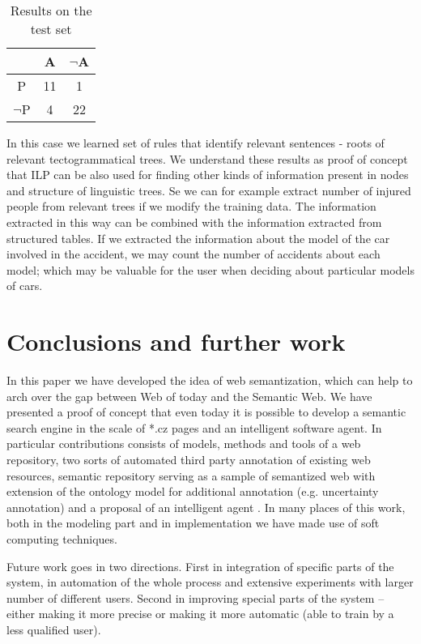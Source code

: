 \documentclass{sig-alternate}
\begin{document}
\begin{table}
\label{tab:results}
\centering
\caption{Results on the test set}
\begin{tabular}{|c|c|c|} \hline
 		&A	&$\neg$A	\\ \hline
P		& 11&1 \\ \hline
$\neg$P	& 4 &22\\ \hline
\hline\end{tabular}
\end{table}


In this case we learned set of rules that identify relevant sentences - roots of relevant tectogrammatical trees. We understand these results as proof of concept that ILP can be also used for finding other kinds of information present in nodes and structure of linguistic trees. Se we can for example extract number of injured people from relevant trees if we modify the training data. 
The information extracted in this way can be combined with the information extracted from structured tables. If we extracted the information about the model of the car involved in the accident, we may count the number of accidents about each model; which may be valuable for the user when deciding about particular models of cars. 



\section{Conclusions and further work}
In this paper we have developed the idea of web semantization, which can help to arch over the gap between Web of today and the Semantic Web. We have presented a proof of concept that even today it is possible to develop a semantic search engine in the scale of *.cz pages and an intelligent software agent. In particular contributions consists of models, methods and tools of a web repository, two sorts of automated third party annotation of existing web resources, semantic repository serving as a sample of semantized web with extension of the ontology model for additional annotation (e.g. uncertainty annotation) and a proposal of an intelligent agent . In many places of this work, both in the modeling part and in implementation we have made use of soft computing techniques. 

Future work goes in two directions. First in integration of specific parts of the system,  in automation of the whole process and extensive experiments with larger number of different users. Second in improving special parts of the system -- either making it more precise or making it more automatic (able to train by a less qualified user).
\end{document}
